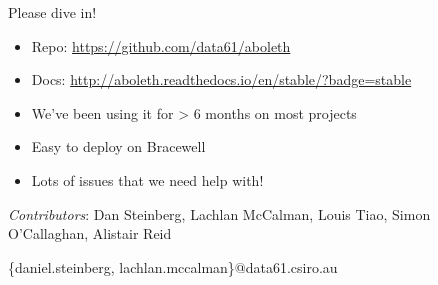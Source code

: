 \documentclass[lualatex, aspectratio=169]{beamer}
\begin{document}
\begin{frame}{Please dive in!}

  \begin{itemize}
    \item Repo: \url{https://github.com/data61/aboleth}
    \item Docs: \url{http://aboleth.readthedocs.io/en/stable/?badge=stable}
    \item We've been using it for > 6 months on most projects
    \item Easy to deploy on Bracewell
    \item Lots of issues that we need help with!
  \end{itemize}

  \hspace{2cm}


  \hspace{2cm}

  \emph{Contributors}: Dan Steinberg, Lachlan McCalman, Louis Tiao, Simon O'Callaghan, Alistair Reid

  \{daniel.steinberg, lachlan.mccalman\}@data61.csiro.au

\end{frame}
\end{document}
